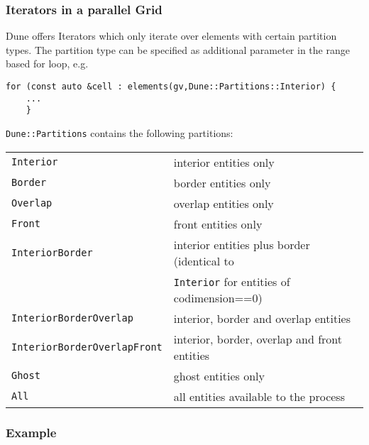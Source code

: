 \begin{frame}[fragile]
  \frametitle<presentation>{Iterators in a parallel Grid}
  \small
  Dune offers Iterators which only iterate over elements with certain partition types. The partition type can be specified as additional parameter in the range based for loop, e.g.
\begin{lstlisting}[breaklines=true,basicstyle=\ttfamily\small]
    for (const auto &cell : elements(gv,Dune::Partitions::Interior) {
    ...
    }
\end{lstlisting}

\lstinline!Dune::Partitions! contains the following partitions:\smallskip\\

    \begin{tabular}{ll}
      \lstinline!Interior! & interior entities only\\
      \lstinline!Border! & border entities only\\
      \lstinline!Overlap! & overlap entities only\\
      \lstinline!Front! & front entities only\\
      \lstinline!InteriorBorder! & interior entities plus border (identical to \\
     & \lstinline!Interior! for entities of  codimension==0)\\
      \lstinline!InteriorBorderOverlap! & interior, border and overlap entities\\
      \lstinline!InteriorBorderOverlapFront! & interior, border, overlap and front entities \\
      \lstinline!Ghost! & ghost entities only\\
      \lstinline!All! & all entities available to the process
    \end{tabular}
\end{frame}

\begin{frame}
  \frametitle{Example}
  
\end{frame}

